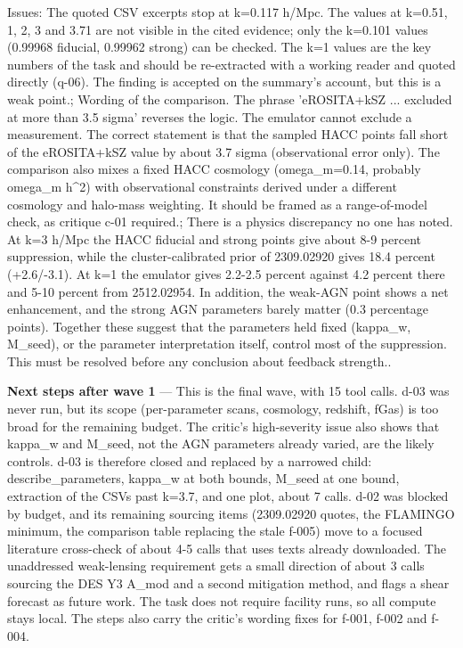 \documentclass[11pt,a4paper]{article}
\begin{document}
Issues: The quoted CSV excerpts stop at k=0.117 h/Mpc. The values at k=0.51, 1, 2, 3 and 3.71 are not visible in the cited evidence; only the k=0.101 values (0.99968 fiducial, 0.99962 strong) can be checked. The k=1 values are the key numbers of the task and should be re-extracted with a working reader and quoted directly (q-06). The finding is accepted on the summary's account, but this is a weak point.; Wording of the comparison. The phrase 'eROSITA+kSZ ... excluded at more than 3.5 sigma' reverses the logic. The emulator cannot exclude a measurement. The correct statement is that the sampled HACC points fall short of the eROSITA+kSZ value by about 3.7 sigma (observational error only). The comparison also mixes a fixed HACC cosmology (omega\_m=0.14, probably omega\_m h\textasciicircum{}2) with observational constraints derived under a different cosmology and halo-mass weighting. It should be framed as a range-of-model check, as critique c-01 required.; There is a physics discrepancy no one has noted. At k=3 h/Mpc the HACC fiducial and strong points give about 8-9 percent suppression, while the cluster-calibrated prior of 2309.02920 gives 18.4 percent (+2.6/-3.1). At k=1 the emulator gives 2.2-2.5 percent against 4.2 percent there and 5-10 percent from 2512.02954. In addition, the weak-AGN point shows a net enhancement, and the strong AGN parameters barely matter (0.3 percentage points). Together these suggest that the parameters held fixed (kappa\_w, M\_seed), or the parameter interpretation itself, control most of the suppression. This must be resolved before any conclusion about feedback strength..

\textbf{Next steps after wave 1} --- This is the final wave, with 15 tool calls. d-03 was never run, but its scope (per-parameter scans, cosmology, redshift, fGas) is too broad for the remaining budget. The critic's high-severity issue also shows that kappa\_w and M\_seed, not the AGN parameters already varied, are the likely controls. d-03 is therefore closed and replaced by a narrowed child: describe\_parameters, kappa\_w at both bounds, M\_seed at one bound, extraction of the CSVs past k=3.7, and one plot, about 7 calls. d-02 was blocked by budget, and its remaining sourcing items (2309.02920 quotes, the FLAMINGO minimum, the comparison table replacing the stale f-005) move to a focused literature cross-check of about 4-5 calls that uses texts already downloaded. The unaddressed weak-lensing requirement gets a small direction of about 3 calls sourcing the DES Y3 A\_mod and a second mitigation method, and flags a shear forecast as future work. The task does not require facility runs, so all compute stays local. The steps also carry the critic's wording fixes for f-001, f-002 and f-004.
\end{document}
